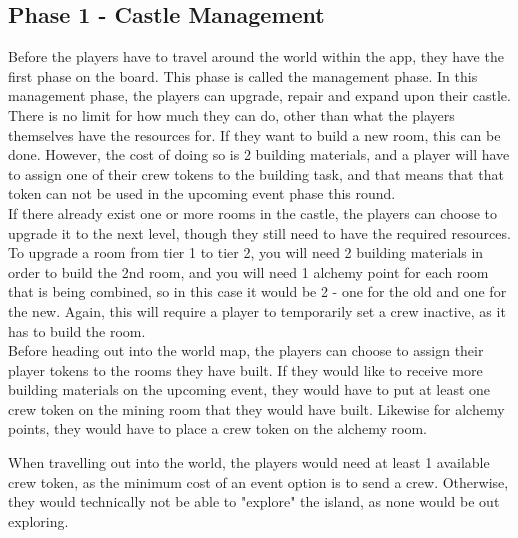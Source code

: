 \subsection{Phase 1 - Castle Management}
Before the players have to travel around the world within the app, they have the first phase on the board. This phase is called the management phase. 
In this management phase, the players can upgrade, repair and expand upon their castle.
There is no limit for how much they can do, other than what the players themselves have the resources for. If they want to build a new room, this can be done. However, the cost of doing so is 2 building materials, and a player will have to assign one of their crew tokens to the building task, and that means that that token can not be used in the upcoming event phase this round.\\
If there already exist one or more rooms in the castle, the players can choose to upgrade it to the next level, though they still need to have the required resources. To upgrade a room from tier 1 to tier 2, you will need 2 building materials in order to build the 2nd room, and you will need 1 alchemy point for each room that is being combined, so in this case it would be 2 - one for the old and one for the new. Again, this will require a player to temporarily set a crew inactive, as it has to build the room.\\

Before heading out into the world map, the players can choose to assign their player tokens to the rooms they have built. If they would like to receive more building materials on the upcoming event, they would have to put at least one crew token on the mining room that they would have built. Likewise for alchemy points, they would have to place a crew token on the alchemy room. 

When travelling out into the world, the players would need at least 1 available crew token, as the minimum cost of an event option is to send a crew. Otherwise, they would technically not be able to "explore" the island, as none would be out exploring.


